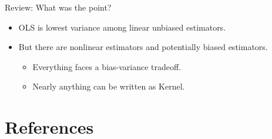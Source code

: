 \begin{frame}{Review: What was the point?}
\begin{itemize}
\item OLS is lowest variance among linear unbiased estimators.
\item But there are \alert{nonlinear} estimators and potentially \alert{biased} estimators.
\begin{itemize}
\item Everything faces a \alert{bias-variance} tradeoff.
\item Nearly anything can be written as Kernel.
\end{itemize}
\end{itemize}

\section*{References}
\end{frame}

%






